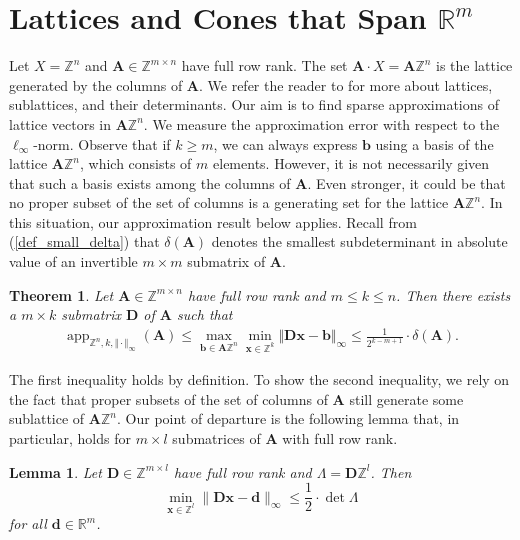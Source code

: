 \documentclass[pdflatex]{sn-jnl}
\DeclareMathOperator{\app}{app}
\newcommand{\R}{\mathbb{R}}
\newcommand{\Z}{\mathbb{Z}}
\newcommand{\bA}{\bm{A}}
\newcommand{\bx}{\bm{x}}
\newcommand{\bb}{\bm{b}}
\newcommand{\bd}{\bm{d}}
\newcommand{\bD}{\bm{D}}
\theoremstyle{thmstyleone}%
\newtheorem{theorem}{Theorem}%
\newtheorem{lemma}{Lemma}
\theoremstyle{thmstyletwo}%
\theoremstyle{thmstylethree}%
\begin{document}
	\section{Lattices and Cones that Span $\R^m$}
	\label{s_lattices}
	Let $X = \Z^n$ and $\bA\in\Z^{m \times n}$ have full row rank. The set $\bA\cdot X = \bA\Z^n$ is the lattice generated by the columns of $\bA$. We refer the reader to \cite{lekkerkerker2014geometry} for more about lattices, sublattices, and their determinants. Our aim is to find sparse approximations of lattice vectors in $\bA\Z^n$. We measure the approximation error with respect to the $\ell_\infty$-norm. Observe that if $k\geq m$, we can always express $\bb$ using a basis of the lattice $\bA\Z^n$, which consists of $m$ elements. However, it is not necessarily given that such a basis exists among the columns of $\bA$. Even stronger, it could be that no proper subset of the set of columns is a generating set for the lattice $\bA\Z^n$. In this situation, our approximation result below applies. Recall from (\ref{def_small_delta}) that $\delta(\bA)$ denotes the smallest subdeterminant in absolute value of an invertible $m\times m$ submatrix of $\bA$. 
	\begin{theorem}
		\label{thm_lattice_main}
		Let $\bA\in\Z^{m\times n}$ have full row rank and $m\leq k\leq n$. Then there exists a $m\times k$ submatrix $\bD$ of $\bA$ such that 
		\begin{align*}
			\app_{\Z^n,k,\Vert\cdot\Vert_\infty}(\bA) \leq \max_{\bb\in \bA\Z^n}\min_{\bx\in\Z^k}\Vert \bD\bx - \bb\Vert_\infty \leq \frac{1}{2^{k - m + 1}}\cdot \delta(\bA).
		\end{align*}
	\end{theorem}
	The first inequality holds by definition. 
	To show the second inequality, we rely on the fact that proper subsets of the set of columns of $\bA$ still generate some sublattice of $\bA\Z^n$. 
	Our point of departure is the following lemma that, in particular, holds for $m\times l$ submatrices of $\bA$ with full row rank. 
	\begin{lemma}
		\label{lemma_lattice_covering}
		Let $\bD\in\Z^{m\times l}$ have full row rank and $\Lambda =\bD \Z^l$. Then
		\[
		\min_{\bx\in \Z^l}\|\bD\bx-\bd\|_\infty  \le \frac{1}{2}\cdot\det\Lambda
		\]
		for all $\bd\in \R^m$.
	\end{lemma}
\end{document}
